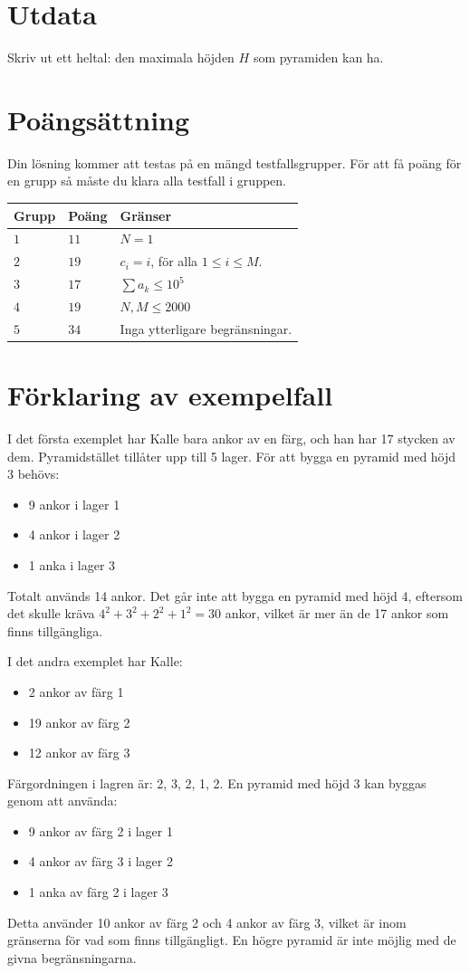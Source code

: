 \section*{Utdata}
Skriv ut ett heltal: den maximala höjden $H$ som pyramiden kan ha.


\section*{Poängsättning}
Din lösning kommer att testas på en mängd testfallsgrupper.
För att få poäng för en grupp så måste du klara alla testfall i gruppen.

\noindent
\begin{tabular}{| l | l | p{12cm} |}
  \hline
  \textbf{Grupp} & \textbf{Poäng} & \textbf{Gränser} \\ \hline
  $1$    & $11$       & $N = 1$ \\ \hline
  $2$    & $19$       & $c_i = i$, för alla $1 \leq i \leq M$. \\ \hline
  $3$    & $17$       & $\sum a_k \le 10^5$ \\ \hline
  $4$    & $19$       & $N, M \le 2000$ \\ \hline
  $5$    & $34$       & Inga ytterligare begränsningar. \\ \hline
\end{tabular}

\section*{Förklaring av exempelfall}
I det första exemplet har Kalle bara ankor av en färg, och han har 17 stycken av dem. Pyramidstället tillåter
upp till 5 lager. För att bygga en pyramid med höjd 3 behövs:
\begin{itemize}
    \item 9 ankor i lager 1
    \item 4 ankor i lager 2
    \item 1 anka i lager 3
\end{itemize}
Totalt används 14 ankor. Det går inte att bygga en pyramid med höjd 4, eftersom det skulle kräva
$4^2 + 3^2 + 2^2 + 1^2 = 30$ ankor, vilket är mer än de 17 ankor som finns tillgängliga.

I det andra exemplet har Kalle:
\begin{itemize}
    \item 2 ankor av färg 1
    \item 19 ankor av färg 2
    \item 12 ankor av färg 3
\end{itemize}
Färgordningen i lagren är: 2, 3, 2, 1, 2. En pyramid med höjd 3 kan byggas genom att använda:
\begin{itemize}
    \item 9 ankor av färg 2 i lager 1
    \item 4 ankor av färg 3 i lager 2
    \item 1 anka av färg 2 i lager 3
\end{itemize}
Detta använder 10 ankor av färg 2 och 4 ankor av färg 3, vilket är inom gränserna för vad som finns tillgängligt.
En högre pyramid är inte möjlig med de givna begränsningarna.
